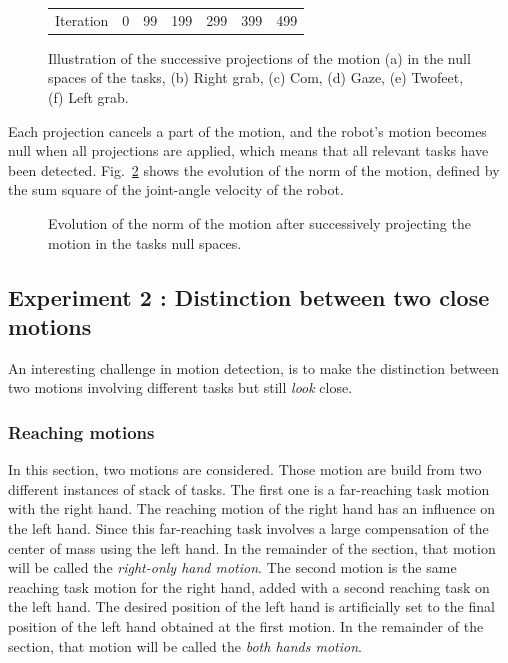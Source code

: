 \documentclass[letterpaper, 10pt, conference]{ieeeconf}      %
\begin{document}
\begin{figure}[t]
\begin{tabular}{c@{}c@{}c@{}c@{}c@{}c@{}c}
\\
Iteration & 0 & 99 & 199 & 299 & 399 & 499\\
\end{tabular}
\caption{Illustration of the successive projections of the motion (a) in the null spaces of the tasks,
(b) Right grab, (c) Com, (d) Gaze, (e) Twofeet, (f) Left grab.}
\label{fig:snapshotXpqdot}
\end{figure}
Each projection cancels a part of the motion, and the robot's motion becomes null when all
projections are applied,
which means that all relevant tasks have been detected.
Fig.~\ref{fig:xp3Pqdot} shows the evolution of the norm of the motion,
defined by the sum square of the joint-angle velocity of the robot.
\begin{figure}[t]
\begin{center}
\resizebox{.48\textwidth}{!} {
      
    }
\end{center}
\caption{Evolution of the norm of the motion after successively projecting the motion in the
	tasks null spaces.}
\label{fig:xp3Pqdot}
\end{figure}

\subsection{Experiment 2 : Distinction between two close motions}
\label{sec:distinc}
An interesting challenge in motion detection,
is to make the distinction between two motions
involving different tasks but still \emph{look} close.

\subsubsection{Reaching motions}
\label{sec:distinc1}
In this section, two motions are considered. Those motion are build from two different instances of stack of tasks.
The first one is a far-reaching task motion with the right hand.
The reaching motion of the right hand has an influence on the left hand.
Since this far-reaching task involves a large compensation of the center of mass
using the left hand.
In the remainder of the section, that motion will be called the
\emph{right-only hand motion}.
The second motion is the same reaching task motion for the right hand, added with a
second reaching task on the left hand. The desired position of the left
hand is artificially set to the final position of the left hand obtained at the first motion.
In the remainder of the section, that motion will be called the
\emph{both hands motion}.
\end{document}
